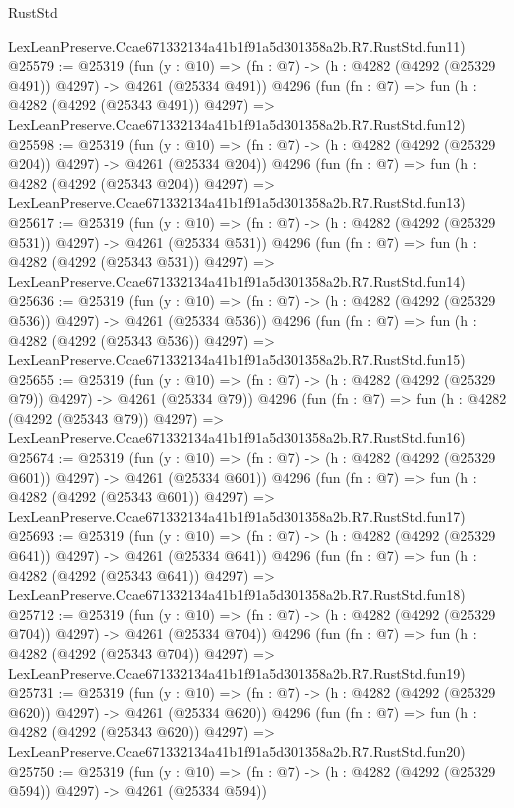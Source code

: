 \begin{lexlean}{RustStd}
\begin{coremodule}
    LexLeanPreserve.Ccae671332134a41b1f91a5d301358a2b.R7.RustStd.fun11)
@25579 := @25319
    (fun (y : @10) => (fn : @7) -> (h : @4282 (@4292 (@25329 @491)) @4297) -> @4261 (@25334 @491))
    @4296
    (fun (fn : @7) =>
    fun (h : @4282 (@4292 (@25343 @491)) @4297) =>
    LexLeanPreserve.Ccae671332134a41b1f91a5d301358a2b.R7.RustStd.fun12)
@25598 := @25319
    (fun (y : @10) => (fn : @7) -> (h : @4282 (@4292 (@25329 @204)) @4297) -> @4261 (@25334 @204))
    @4296
    (fun (fn : @7) =>
    fun (h : @4282 (@4292 (@25343 @204)) @4297) =>
    LexLeanPreserve.Ccae671332134a41b1f91a5d301358a2b.R7.RustStd.fun13)
@25617 := @25319
    (fun (y : @10) => (fn : @7) -> (h : @4282 (@4292 (@25329 @531)) @4297) -> @4261 (@25334 @531))
    @4296
    (fun (fn : @7) =>
    fun (h : @4282 (@4292 (@25343 @531)) @4297) =>
    LexLeanPreserve.Ccae671332134a41b1f91a5d301358a2b.R7.RustStd.fun14)
@25636 := @25319
    (fun (y : @10) => (fn : @7) -> (h : @4282 (@4292 (@25329 @536)) @4297) -> @4261 (@25334 @536))
    @4296
    (fun (fn : @7) =>
    fun (h : @4282 (@4292 (@25343 @536)) @4297) =>
    LexLeanPreserve.Ccae671332134a41b1f91a5d301358a2b.R7.RustStd.fun15)
@25655 := @25319
    (fun (y : @10) => (fn : @7) -> (h : @4282 (@4292 (@25329 @79)) @4297) -> @4261 (@25334 @79))
    @4296
    (fun (fn : @7) =>
    fun (h : @4282 (@4292 (@25343 @79)) @4297) =>
    LexLeanPreserve.Ccae671332134a41b1f91a5d301358a2b.R7.RustStd.fun16)
@25674 := @25319
    (fun (y : @10) => (fn : @7) -> (h : @4282 (@4292 (@25329 @601)) @4297) -> @4261 (@25334 @601))
    @4296
    (fun (fn : @7) =>
    fun (h : @4282 (@4292 (@25343 @601)) @4297) =>
    LexLeanPreserve.Ccae671332134a41b1f91a5d301358a2b.R7.RustStd.fun17)
@25693 := @25319
    (fun (y : @10) => (fn : @7) -> (h : @4282 (@4292 (@25329 @641)) @4297) -> @4261 (@25334 @641))
    @4296
    (fun (fn : @7) =>
    fun (h : @4282 (@4292 (@25343 @641)) @4297) =>
    LexLeanPreserve.Ccae671332134a41b1f91a5d301358a2b.R7.RustStd.fun18)
@25712 := @25319
    (fun (y : @10) => (fn : @7) -> (h : @4282 (@4292 (@25329 @704)) @4297) -> @4261 (@25334 @704))
    @4296
    (fun (fn : @7) =>
    fun (h : @4282 (@4292 (@25343 @704)) @4297) =>
    LexLeanPreserve.Ccae671332134a41b1f91a5d301358a2b.R7.RustStd.fun19)
@25731 := @25319
    (fun (y : @10) => (fn : @7) -> (h : @4282 (@4292 (@25329 @620)) @4297) -> @4261 (@25334 @620))
    @4296
    (fun (fn : @7) =>
    fun (h : @4282 (@4292 (@25343 @620)) @4297) =>
    LexLeanPreserve.Ccae671332134a41b1f91a5d301358a2b.R7.RustStd.fun20)
@25750 := @25319
    (fun (y : @10) => (fn : @7) -> (h : @4282 (@4292 (@25329 @594)) @4297) -> @4261 (@25334 @594))

\end{coremodule}
\end{lexlean}
